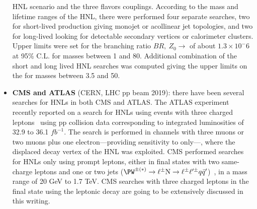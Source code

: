 \begin{itemize}
  HNL scenario and the three flavors couplings. 
  According to the mass and lifetime ranges of the HNL, there were performed four separate searches, two for short-lived \hnl production giving monojet or acollinear jet topologies, 
  and two for long-lived \hnl looking for detectable secondary vertices or calorimeter clusters.
 Upper limits were set for the branching ratio $BR, \: Z_0\rightarrow$ \hnl of
 about $1.3 \times 10^-6$ at 95\% C.L. for \hnl masses between 1 and
 80\GeV. Additional combination of the short and long lived HNL searches was computed giving the upper limits on the \mixpar for \hnl masses between 3.5 and
 50\GeV. 
\item \textbf{CMS and ATLAS} (CERN, LHC pp beam 2019): there have been several searches for HNLs in both CMS and ATLAS.
The ATLAS experiment recently reported on a search for HNLs using events with three charged leptons~\cite{atlasintro2} using 
pp collision data corresponding to integrated luminosities of 32.9 to
36.1 $fb^{-1}$. 
The search is performed in channels with three muons or two muons plus
one electron---providing sensitivity  to \mixparm only---, where the 
displaced decay vertex of the HNL was exploited.
CMS performed searches for HNLs only using prompt leptons,
either in final states with two same-charge leptons and one or two jets
(\(\PW^{\pm(\ast)}\to\ell^{\pm}\hnl\to\ell^{\pm}\ell^{\prime\pm}q\bar{q}^{\prime}\))~\cite{Sirunyan:2018xiv},
in a mass range of 20 GeV to 1.7 TeV.
CMS searches with three charged leptons in the final state using the leptonic \PW decay are going to be extensively discussed in this
writing.
\end{itemize}

